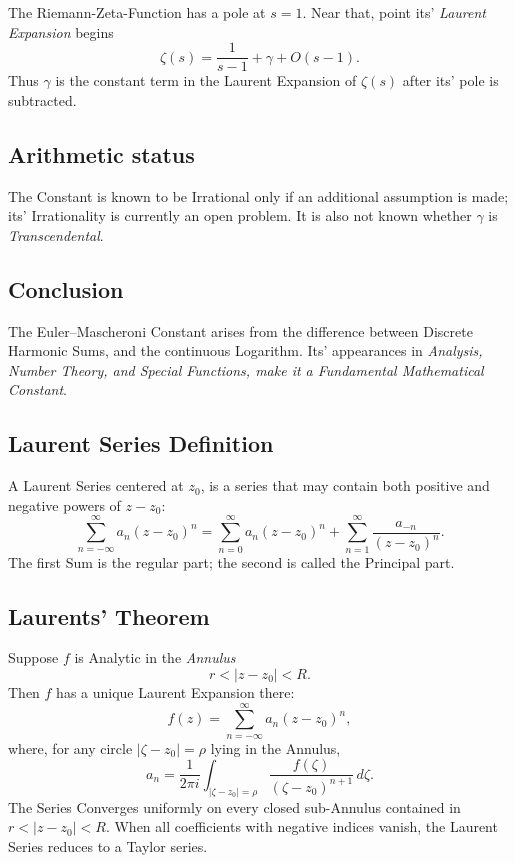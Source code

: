 \documentclass[a4paper, 10pt, onepage]{elegantbook}
\begin{document}
The Riemann-Zeta-Function has a pole at \(s=1\). Near that, point its' \emph{Laurent Expansion} begins
\[
\zeta(s)
=
\frac{1}{s-1}+\gamma+O(s-1).
\]
Thus \(\gamma\) is the constant term in the Laurent Expansion of \(\zeta(s)\) after its' pole is subtracted.

\subsection{Arithmetic status}

The Constant is known to be Irrational only if an additional assumption is made; its' Irrationality is currently an open problem. It is also not known whether \(\gamma\) is \emph{Transcendental}.

\subsection{Conclusion}

The Euler--Mascheroni Constant arises from the difference between Discrete Harmonic Sums, and the continuous Logarithm. Its' appearances in \emph{Analysis, Number Theory, and Special Functions, make it a Fundamental Mathematical Constant}.



\subsection{Laurent Series Definition}

A Laurent Series centered at \(z_0\), is a series that may contain both positive and negative powers of \(z-z_0\):
\[
\sum_{n=-\infty}^{\infty} a_n(z-z_0)^n
=
\sum_{n=0}^{\infty}a_n(z-z_0)^n
+
\sum_{n=1}^{\infty}\frac{a_{-n}}{(z-z_0)^n}.
\]
The first Sum is the regular part; the second is called the Principal part.

\subsection{Laurents' Theorem}

Suppose \(f\) is Analytic in the \emph{Annulus}
\[
r<|z-z_0|<R.
\]
Then \(f\) has a unique Laurent Expansion there:
\[
f(z)=\sum_{n=-\infty}^{\infty}a_n(z-z_0)^n,
\]
where, for any circle \(|\zeta-z_0|=\rho\) lying in the Annulus,
\[
a_n=
\frac{1}{2\pi i}
\int_{|\zeta-z_0|=\rho}
\frac{f(\zeta)}{(\zeta-z_0)^{n+1}}\,d\zeta.
\]
The Series Converges uniformly on every closed sub-Annulus contained in \(r<|z-z_0|<R\). When all coefficients with negative indices vanish, the Laurent Series reduces to a Taylor series.
\end{document}
